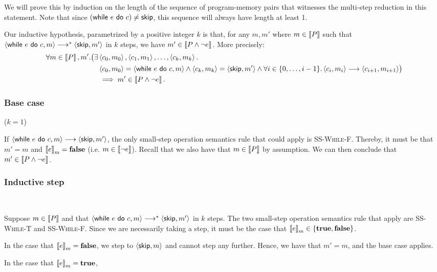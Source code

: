 \documentclass[10pt]{article}
\theoremstyle{definition}
\begin{document}
We will prove this by induction on the length of the sequence of program-memory pairs that witnesses 
the multi-step reduction in this statement. Note that since $(\While e do c) \neq \Skip$, 
this sequence will always have length at least 1.

Our inductive hypothesis, parametrized by a positive integer $k$ is that, 
for any $m, m'$ where $m \in \left\llbracket P \right\rrbracket$ such that 
$\Cfg(\While e do c, m) \sstepstotrans \Cfg(\Skip, m')$ in $k$ steps, 
we have $m' \in \left\llbracket P \wedge \neg e \right\rrbracket$.
More precisely:
\begin{align*}
    \forall m \in \Interp{P}, m'. 
    \bigl(\exists &\Cfg(c_0, m_0), \Cfg(c_1, m_1), \ldots, \Cfg(c_k, m_k). \\
     &\Cfg(c_0, m_0) = \Cfg(\While e do c, m)
     \wedge \Cfg(c_k, m_k) = \Cfg(\Skip, m') 
     \wedge \forall i \in \{0, \ldots, i-1\}. \Cfg(c_i, m_i) \sstepsto \Cfg(c_{i+1}, m_{i+1}) 
     \bigr) \\
    &\implies m' \in \Interp{P \wedge \neg e}.
\end{align*}

\subsubsection*{Base case} ($k = 1$)

\noindent
If $\Cfg(\While e do c, m) \sstepsto \Cfg(\Skip, m')$, the only small-step operation semantics rule 
that could apply is \textsc{SS-While-F}.
Thereby, it must be that $m' = m$ and $\Eval(e, m) = \False$ (i.e. $m \in \left\llbracket \neg e \right\rrbracket$).
Recall that we also have that $m \in \left\llbracket P \right\rrbracket$ by assumption.
We can then conclude that $m' \in \left\llbracket P \wedge \neg e \right\rrbracket$.

\subsubsection*{Inductive step}\

\noindent
Suppose $m \in \left\llbracket P \right\rrbracket$ and that $\Cfg(\While e do c, m) \sstepstotrans \Cfg(\Skip, m')$ in $k$ steps.
The two small-step operation semantics rule that apply are \textsc{SS-While-T} and \textsc{SS-While-F}.
Since we are necessarily taking a step, it must be the case that $\Eval(e, m) \in \{\True, \False\}$.

In the case that $\Eval(e, m) = \False$, we step to $\Cfg(\Skip, m)$ and cannot step any further.
Hence, we have that $m' = m$, and the base case applies.

In the case that $\Eval(e, m) = \True$, 
\end{document}
